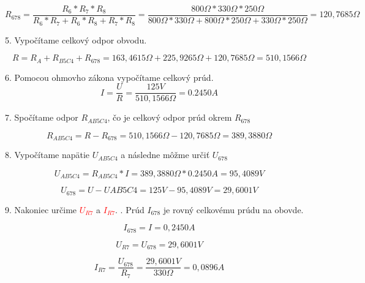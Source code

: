 \documentclass[a4paper,12pt]{article}
\begin{document}
\begin{equation*}
R_{678} = \frac{R_6*R_7*R_8}{R_6*R_7+R_6*R_8+R_7*R_8} = \frac{800\Omega*330\Omega*250\Omega}{800\Omega*330\Omega+800\Omega*250\Omega+330\Omega*250\Omega} = 120,7685\Omega
\end{equation*}
\newpage

5. Vypočítame celkový odpor obvodu.

\begin{equation*}
R = R_A + R_{B5C4} + R_{678} = 163,4615\Omega + 225,9265\Omega + 120,7685\Omega =  510,1566\Omega
\end{equation*}


6. Pomocou ohmovho zákona vypočítame celkový prúd.
\begin{equation*}
I=\frac{U}{R} = \frac{125V}{510,1566\Omega} = 0.2450A
\end{equation*}

7. Spočítame odpor $R_{AB5C4}$, čo je celkový odpor prúd okrem $R_{678}$

\begin{equation*}
R_{AB5C4} = R - R_{678} = 510,1566\Omega - 120,7685\Omega = 389,3880\Omega
\end{equation*}

 8. Vypočítame napätie $U_{AB5C4}$ a následne môžme určiť $U_{678}$

\begin{equation*}
U_{AB5C4} = R_{AB5C4} * I = 389,3880\Omega * 0.2450A = 95,4089V
\end{equation*}

\begin{equation*}
U_{678} = U - U{AB5C4} = 125V - 95,4089V = 29,6001V
\end{equation*}

9. Nakoniec určime \textcolor{red}{$U_{R7}$} a \textcolor{red}{$I_{R7}$}. . Prúd $I_{678}$ je rovný celkovému prúdu na obovde. 

\begin{equation*}
 I_{678} = I = 0,2450 A
\end{equation*}

\begin{equation*}
U_{R7} = U_{678} = 29,6001 V
\end{equation*}

\begin{equation*}
I_{R7} = \frac{U_{678}}{R_7} = \frac{29,6001V}{330\Omega} = 0,0896A
\end{equation*}

\newpage
\end{document}
